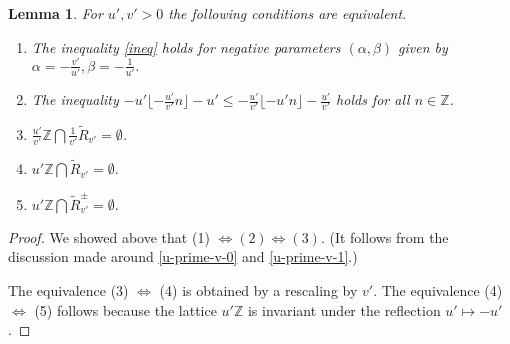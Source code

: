 \documentclass[12pt,letterpaper, reqno]{amsart}
\newtheorem{lem}[thm]{Lemma}
\theoremstyle{definition}
\theoremstyle{remark}
\newcommand{\ZZ}{\ensuremath{\mathbb{Z}}}
\newcommand{\uu}{{u'}}
\newcommand{\vv}{{v'}}
\newcommand{\R}{{R}}
\newcommand{\floor}[1]{\lfloor{#1}\rfloor}
\newcommand{\ceil}[1]{\lceil{#1}\rceil}
\begin{document}
\begin{lem}\label{lem:52}
For $\uu, \vv>0$  the following conditions are equivalent.

\begin{enumerate}
\item[(1)] The inequality \eqref{ineq} holds for negative parameters $(\alpha, \beta)$ 
given by $\alpha= -\frac{\vv}{\uu}, \beta= -\frac{1}{\uu}.$ 
\item[(2)]  The inequality $-{\uu} \floor{ -\frac{\uu}{\vv} n} -{\uu} \le -\frac{\uu}{\vv} \floor{ -{\uu} n} - \frac{\uu}{\vv}$ holds for all $n\in\ZZ$.
\item[(3)] $\frac{\uu}{\vv}\ZZ \bigcap \frac1{\vv}\widetilde{\R}_\vv = \emptyset$.
\item[(4)] 
$\uu\ZZ \bigcap \widetilde{\R}_\vv = \emptyset.$
\item[(5)] 
${\uu} \ZZ \bigcap \widetilde{\R}_\vv^{\pm} = \emptyset.$
\end{enumerate}
\end{lem}

\begin{proof}
We showed above  that (1) $\Leftrightarrow (2) \Leftrightarrow (3)$. 
(It follows from  the discussion made around  \eqref{u-prime-v-0} and \eqref{u-prime-v-1}.)

The equivalence (3) $\Leftrightarrow$ (4)  is obtained by a rescaling by ${\vv}$.
The equivalence (4) $\Leftrightarrow$ (5) follows because the lattice $\uu \ZZ$
is invariant under the reflection $\uu \mapsto -\uu$.
\end{proof}
\end{document}
